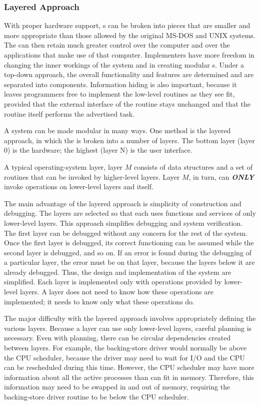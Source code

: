 \subsubsection{Layered Approach}\label{subsubsec:Layered_Approach}
With proper hardware support, s can be broken into pieces that are smaller and more appropriate than those allowed by the original MS-DOS and UNIX systems.
The  can then retain much greater control over the computer and over the applications that make use of that computer.
Implementers have more freedom in changing the inner workings of the system and in creating modular s.
Under a top-down approach, the overall functionality and features are determined and are separated into components.
Information hiding is also important, because it leaves programmers free to implement the low-level routines as they see fit, provided that the external interface of the routine stays unchanged and that the routine itself performs the advertised task.

A system can be made modular in many ways.
One method is the layered approach, in which the  is broken into a number of layers.
The bottom layer (layer 0) is the hardware; the highest (layer N) is the user interface.

A typical operating-system layer, layer $M$ consists of data structures and a set of routines that can be invoked by higher-level layers.
Layer $M$, in turn, can \textbf{\emph{ONLY}} invoke operations on lower-level layers and itself.

The main advantage of the layered approach is simplicity of construction and debugging.
The layers are selected so that each uses functions and services of only lower-level layers.
This approach simplifies debugging and system verification.
The first layer can be debugged without any concern for the rest of the system.
Once the first layer is debugged, its correct functioning can be assumed while the second layer is debugged, and so on.
If an error is found during the debugging of a particular layer, the error must be on that layer, because the layers below it are already debugged.
Thus, the design and implementation of the system are simplified.
Each layer is implemented only with operations provided by lower-level layers.
A layer does not need to know how these operations are implemented; it needs to know only what these operations do.

The major difficulty with the layered approach involves appropriately defining the various layers.
Because a layer can use only lower-level layers, careful planning is necessary.
Even with planning, there can be circular dependencies created between layers.
For example, the backing-store driver would normally be above the CPU scheduler, because the driver may need to wait for I/O and the CPU can be rescheduled during this time.
However, the CPU scheduler may have more information about all the active processes than can fit in memory.
Therefore, this information may need to be swapped in and out of memory, requiring the backing-store driver routine to be below the CPU scheduler.

